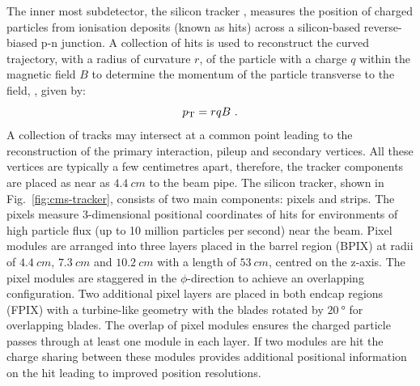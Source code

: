 The inner most subdetector, the silicon tracker \cite{Bayatian:922757}, measures the position of charged particles from ionisation deposits (known as hits) across a silicon-based reverse-biased p-n junction. A collection of hits is used to reconstruct the curved trajectory, with a radius of curvature $r$, of the particle with a charge $q$ within the magnetic field $B$ to determine the momentum of the particle transverse to the field, \pt, given by:
%
\begin{equation}
    p_{\text{T}} = rqB\ .
\end{equation}
%
A collection of tracks may intersect at a common point leading to the reconstruction of the primary interaction, pileup and secondary vertices.  All these vertices are typically a few centimetres apart, therefore, the tracker components are placed as near as ${\SI{4.4}{cm}}$ to the beam pipe.  The silicon tracker, shown in Fig.~\ref{fig:cms-tracker}, consists of two main components: pixels and strips. The pixels measure 3-dimensional positional coordinates of hits for environments of high particle flux (up to 10 million particles per second) near the beam. Pixel modules are arranged into three layers placed in the barrel region (BPIX) at radii of ${\SI{4.4}{cm}}$, ${\SI{7.3}{cm}}$ and ${\SI{10.2}{cm}}$ with a length of ${\SI{53}{cm}}$, centred on the z-axis. The pixel modules are staggered in the $\phi$-direction to achieve an overlapping configuration. Two additional pixel layers are placed in both endcap regions (FPIX) with a turbine-like geometry with the blades rotated by ${\SI{20}{\degree}}$ for overlapping blades. The overlap of pixel modules ensures the charged particle passes through at least one module in each layer. If two modules are hit the charge sharing between these modules provides additional positional information on the hit leading to improved position resolutions.

